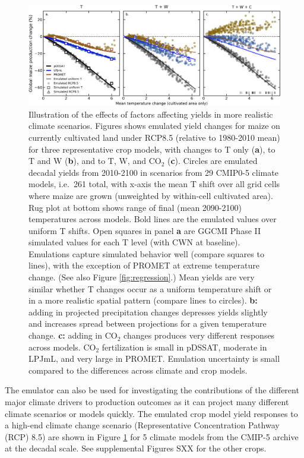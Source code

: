 \documentclass[gmd, manuscript]{copernicus} %
\begin{document}
\begin{figure}[ht]
    \centering
    \includegraphics[width = 16.5cm]{figures/global_em_maize.png}
    \caption{
    Illustration of the effects of factors affecting yields in more realistic climate scenarios. 
    Figures shows emulated yield changes for maize on currently cultivated land under RCP8.5 (relative to 1980-2010 mean) for three representative crop models, with changes to T only (\textbf{a}), to T and W (\textbf{b}), and to T, W, and CO$_2$ (\textbf{c}).
    Circles are emulated decadal yields from 2010-2100 in scenarios from 29 CMIP0-5 climate models, i.e.\ 261 total, with x-axis the mean T shift over all grid cells where maize are grown (unweighted by within-cell cultivated area). Rug plot at bottom shows range of final (mean 2090-2100) temperatures across models.
    Bold lines are the emulated values over uniform T shifts. 
    Open squares in panel \textbf{a} are GGCMI Phase II simulated values for each T level (with CWN at baseline).  
    Emulations capture simulated behavior well (compare squares to lines), with the exception of PROMET at extreme temperature change. (See also Figure \ref{fig:regression}.)
    Mean yields are very similar whether T changes occur as a uniform temperature shift or in a more realistic spatial pattern (compare lines to circles). 
    \textbf{b:} adding in projected precipitation changes depresses yields slightly and increases spread between projections for a given temperature change. 
    \textbf{c:} adding in CO$_2$ changes produces very different responses across models. CO$_2$ fertilization is small in pDSSAT, moderate in LPJmL, and very large in PROMET. 
    Emulation uncertainty is small compared to the differences across climate and crop models.
    }
    \label{fig:globe_em}
\end{figure}

The emulator can also be used for investigating the contributions of the different major climate drivers to production outcomes as it can project many different climate scenarios or models quickly.
The emulated crop model yield responses to a high-end climate change scenario (Representative Concentration Pathway (RCP) 8.5) are shown in Figure \ref{fig:globe_em} for 5 climate models from the CMIP-5 archive \citep{Taylor2012} at the decadal scale. See supplemental Figures SXX for the other crops.
\end{document}
